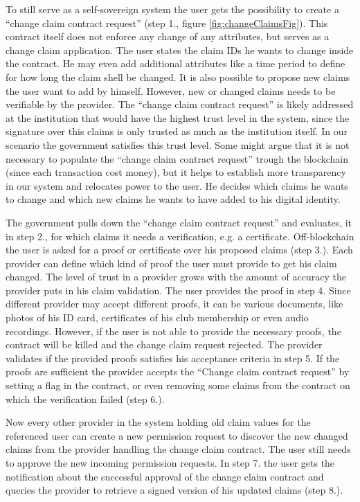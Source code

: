 To still serve as a self-sovereign system the user gets the possibility to create a “change claim contract request” (step 1., figure \ref{fig:changeClaimsFig}). This contract itself does not enforce any change of any attributes, but serves as a change claim application. The user states the claim IDs he wants to change inside the contract. He may even add additional attributes like a time period to define for how long the claim shell be changed. It is also possible to propose new claims the user want to add by himself. However, new or changed claims needs to be verifiable by the provider. The “change claim contract request” is likely addressed at the institution that would have the highest trust level in the system, since the signature over this claims is only trusted as much as the institution itself. In our scenario the government satisfies this trust level. Some might argue that it is not necessary to populate the “change claim contract request” trough the blockchain (since each transaction cost money), but it helps to establish more transparency in our system and relocates power to the user. He decides which claims he wants to change and which new claims he wants to have added to his digital identity. 

The government pulls down the “change claim contract request” and evaluates, it in step 2., for which claims it needs a verification, e.g. a certificate. Off-blockchain the user is asked for a proof or certificate over his proposed claims (step 3.). Each provider can define which kind of proof the user must provide to get his claim changed. The level of trust in a provider grows with the amount of accuracy the provider puts in his claim validation. The user provides the proof in step 4. Since different provider may accept different proofs, it can be various documents, like photos of his ID card, certificates of his club membership or even audio recordings. However, if the user is not able to provide the necessary proofs, the contract will be killed and the change claim request rejected.
The provider validates if the provided proofs satisfies his acceptance criteria in step 5.  If the proofs are sufficient the provider accepts the “Change claim contract request” by setting a flag in the contract, or even removing some claims from the contract on which the verification failed (step 6.). 

Now every other provider in the system holding old claim values for the referenced user can create a new permission request to discover the new changed claims from the provider handling the change claim contract. The user still needs to approve the new incoming permission requests. In step 7. the user gets the notification about the successful approval of the change claim contract and queries the provider to retrieve a signed version of his updated claims (step 8.). 


